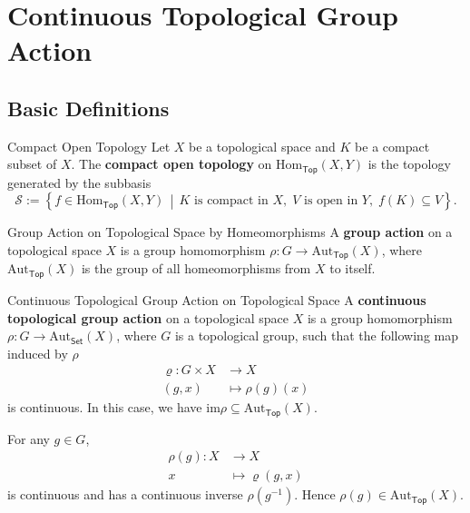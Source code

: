 \documentclass{report}
\newcommand{\midv}{\,\middle\vert\,}
\begin{document}
\section{Continuous Topological Group Action}
\subsection{Basic Definitions}
\begin{definition}{Compact Open Topology}{}
	Let $X$ be a topological space and $K$ be a compact subset of $X$. The \textbf{compact open topology} on $\mathrm{Hom}_{\mathsf{Top}}(X,Y)$ is the topology generated by the subbasis
	\[
		\mathcal{S}:=\left\{f\in \mathrm{Hom}_{\mathsf{Top}}(X,Y)\midv K\text{ is compact in }X,\;V\text{ is open in }Y,\;f(K)\subseteq V\right\}.
	\]
\end{definition}


\begin{definition}{Group Action on Topological Space by Homeomorphisms}{}
	A \textbf{group action} on a topological space $X$ is a group homomorphism $\rho:G\to \mathrm{Aut}_{\mathsf{Top}}(X)$, where $\mathrm{Aut}_{\mathsf{Top}}(X)$ is the group of all homeomorphisms from $X$ to itself.
\end{definition}


\begin{definition}{Continuous Topological Group Action on Topological Space}{}
	A \textbf{continuous topological group action} on a topological space $X$ is a group homomorphism $\rho:G\to \mathrm{Aut}_{\mathsf{Set}}(X)$, where $G$ is a topological group, such that the following map induced by $\rho$
	\begin{align*}
		\varrho:G\times X & \longrightarrow X      \\
		(g,x)             & \longmapsto \rho(g)(x)
	\end{align*}
	is continuous. In this case, we have $\mathrm{im}\rho \subseteq \mathrm{Aut}_{\mathsf{Top}}(X)$.
\end{definition}

\begin{prf}
	For any $g\in G$,
	\begin{align*}
		\rho(g): X & \longrightarrow X        \\
		x          & \longmapsto \varrho(g,x)
	\end{align*}
	is continuous and has a continuous inverse $\rho(g^{-1})$. Hence $\rho(g)\in \mathrm{Aut}_{\mathsf{Top}}(X)$.
\end{prf}
\end{document}
